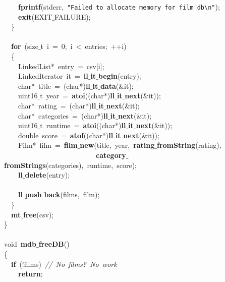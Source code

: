 \documentclass{article}
\begin{document}
\mbox{}\ \ \ \ \textbf{fprintf}(stderr,\ \texttt{"{}Failed\ to\ allocate\ memory\ for\ film\ db}\texttt{\textbackslash{}n}\texttt{"{}}); \\
\mbox{}\ \ \ \ \textbf{exit}(EXIT$\_$FAILURE); \\
\mbox{}\ \ \} \\
\mbox{} \\
\mbox{}\ \ \textbf{for}\ (size$\_$t\ i\ =\ 0;\ i\ \textless{}\ entries;\ ++i) \\
\mbox{}\ \ \{ \\
\mbox{}\ \ \ \ LinkedList*\ entry\ =\ csv[i]; \\
\mbox{}\ \ \ \ LinkedIterator\ it\ =\ \textbf{ll$\_$it$\_$begin}(entry); \\
\mbox{}\ \ \ \ char*\ title\ =\ (char*)\textbf{ll$\_$it$\_$data}(\&it); \\
\mbox{}\ \ \ \ uint16$\_$t\ year\ =\ \textbf{atoi}((char*)\textbf{ll$\_$it$\_$next}(\&it)); \\
\mbox{}\ \ \ \ char*\ rating\ =\ (char*)\textbf{ll$\_$it$\_$next}(\&it); \\
\mbox{}\ \ \ \ char*\ categories\ =\ (char*)\textbf{ll$\_$it$\_$next}(\&it); \\
\mbox{}\ \ \ \ uint16$\_$t\ runtime\ =\ \textbf{atoi}((char*)\textbf{ll$\_$it$\_$next}(\&it)); \\
\mbox{}\ \ \ \ double\ score\ =\ \textbf{atof}((char*)\textbf{ll$\_$it$\_$next}(\&it)); \\
\mbox{}\ \ \ \ Film*\ film\ =\ \textbf{film$\_$new}(title,\ year,\ \textbf{rating$\_$fromString}(rating), \\
\mbox{}\ \ \ \ \ \ \ \ \ \ \ \ \ \ \ \ \ \ \ \ \ \ \ \ \ \ \textbf{category$\_$fromStrings}(categories),\ runtime,\ score); \\
\mbox{}\ \ \ \ \textbf{ll$\_$delete}(entry); \\
\mbox{} \\
\mbox{}\ \ \ \ \textbf{ll$\_$push$\_$back}(films,\ film); \\
\mbox{}\ \ \} \\
\mbox{}\ \ \textbf{mt$\_$free}(csv); \\
\mbox{}\} \\
\mbox{} \\
\mbox{}void\ \textbf{mdb$\_$freeDB}() \\
\mbox{}\{ \\
\mbox{}\ \ \textbf{if}\ (!films)\ \textit{//\ No\ films?\ No\ work} \\
\mbox{}\ \ \ \ \textbf{return}; \\
\end{document}

